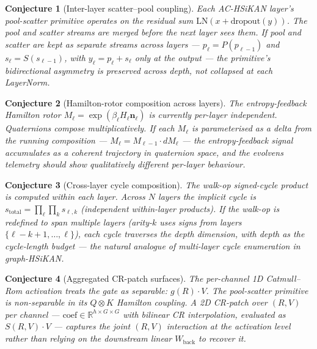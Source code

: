 \documentclass[10pt,a4paper]{article}
\newtheorem{conjecture}{Conjecture}
\begin{document}
\begin{conjecture}[Inter-layer scatter--pool coupling]
Each AC-HSiKAN layer's pool-scatter primitive operates on the residual
sum $\mathrm{LN}(x + \mathrm{dropout}(y))$. The pool and scatter streams
are merged before the next layer sees them. If pool and scatter are
kept as separate streams across layers --- $p_\ell = P(p_{\ell-1})$
and $s_\ell = S(s_{\ell-1})$, with $y_\ell = p_\ell + s_\ell$ only at
the output --- the primitive's bidirectional asymmetry is \emph{preserved}
across depth, not collapsed at each LayerNorm.
\end{conjecture}

\begin{conjecture}[Hamilton-rotor composition across layers]
The entropy-feedback Hamilton rotor $M_\ell = \exp(\beta_\ell H_\ell
\mathbf{n}_\ell)$ is currently per-layer independent. Quaternions
compose multiplicatively. If each $M_\ell$ is parameterised as a
\emph{delta} from the running composition --- $M_\ell = M_{\ell-1}
\cdot dM_\ell$ --- the entropy-feedback signal accumulates as a
coherent trajectory in quaternion space, and the evolvens telemetry
should show qualitatively different per-layer behaviour.
\end{conjecture}

\begin{conjecture}[Cross-layer cycle composition]
The walk-op signed-cycle product is computed within each layer. Across
$N$ layers the implicit cycle is $s_{\text{total}} = \prod_\ell
\prod_k s_{\ell, k}$ (independent within-layer products). If the
walk-op is redefined to span multiple layers (arity-$k$ uses signs
from layers $\{\ell - k + 1, \dots, \ell\}$), each cycle traverses the
depth dimension, with depth as the cycle-length budget --- the natural
analogue of multi-layer cycle enumeration in graph-HSiKAN.
\end{conjecture}

\begin{conjecture}[Aggregated CR-patch surfaces]
The per-channel 1D Catmull--Rom activation treats the gate as
separable: $g(R) \cdot V$. The pool-scatter primitive is non-separable
in its $Q \otimes K$ Hamilton coupling. A 2D CR-patch over $(R, V)$
per channel --- $\mathrm{coef} \in \mathbb{R}^{h \times G \times G}$
with bilinear CR interpolation, evaluated as $S(R, V) \cdot V$ ---
captures the joint $(R, V)$ interaction at the activation level rather
than relying on the downstream linear $W_{\text{back}}$ to recover it.
\end{conjecture}
\end{document}
